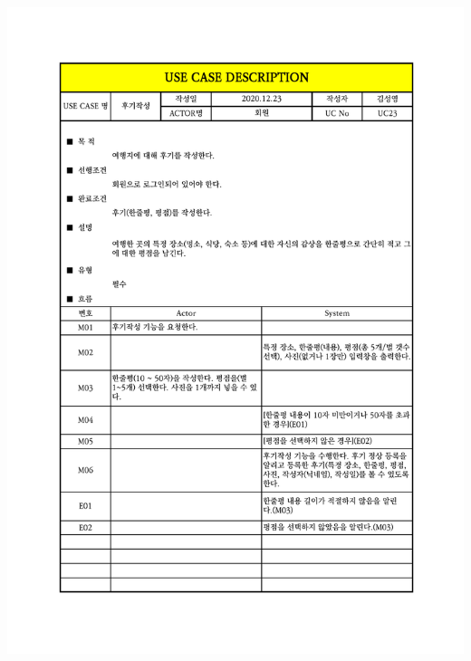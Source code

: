 {{{{{{{{{{{{{{{{{{{{{{{{{\includegraphics[width=1.1\textwidth]{./Figure/Design/Display/usecase/023.pdf} \\
}}}}}}}}}}}}}}}}}}}}}}}}}
